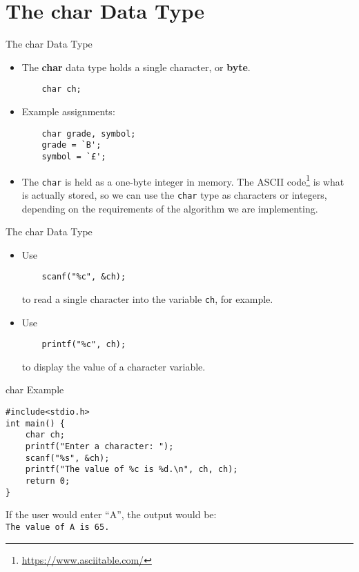 \documentclass[graphics]{beamer}
\begin{document}
\section{The char Data Type}
\begin{frame}[fragile]{The char Data Type}
    \begin{itemize}
        \item The \textbf{char} data type holds a single character, or \textbf{byte}.
        \begin{verbatim}
    char ch;
        \end{verbatim}
        \item Example assignments:
        \begin{verbatim}
    char grade, symbol;
    grade = `B';
    symbol = `£';
        \end{verbatim}
        \item The \texttt{char} is held as a one-byte integer in memory. The ASCII code\footnote{\url{https://www.asciitable.com/}} is what is actually stored, so we can use the \texttt{char} type as characters or integers, depending on the requirements of the algorithm we are implementing.
    \end{itemize}
\end{frame}

\begin{frame}[fragile]{The char Data Type}
    \begin{itemize}
        \item Use
        \begin{verbatim}
    scanf("%c", &ch);
        \end{verbatim}
        to read a single character into the variable \texttt{ch}, for example.
        \item Use
        \begin{verbatim}
    printf("%c", ch);
        \end{verbatim}
        to display the value of a character variable.
    \end{itemize}
\end{frame}

\begin{frame}[fragile]{char Example}
    \begin{verbatim}
#include<stdio.h>
int main() {
    char ch;
    printf("Enter a character: ");
    scanf("%s", &ch);
    printf("The value of %c is %d.\n", ch, ch);
    return 0;
}
    \end{verbatim}
    If the user would enter ``A'', the output would be: \\
    \texttt{The value of A is 65.}
\end{frame}
\end{document}
